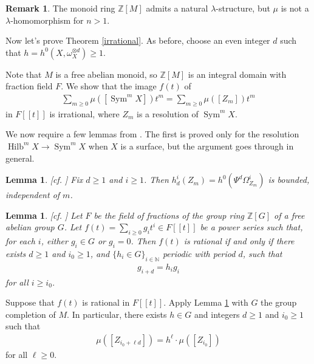 \documentclass{amsart}
\newtheorem{lem}[thm]{Lemma}
\theoremstyle{definition}
\newtheorem{rmk}[thm]{Remark}
\DeclareMathOperator{\Sym}{Sym}
\DeclareMathOperator{\Hilb}{Hilb}
\numberwithin{equation}{section}
\begin{document}
\begin{rmk}
The monoid ring $\mathbb{Z}[M]$ admits a natural $\lambda$-structure, but $\mu$ is not a $\lambda$-homomorphism for $n > 1$.
\end{rmk}


Now let's prove Theorem \ref{irrational}. As before, choose an even integer $d$ such that $h=h^0(X, \omega_X^{\otimes d}) \geq 1$.

Note that $M$ is a free abelian monoid, so $\mathbb{Z}[M]$ is an integral domain with fraction field $F$. We show that the image $f(t)$ of
\begin{align*}
    \sum_{m \geq 0} \mu([\Sym^m X]) t^m = \sum_{m \geq 0} \mu([Z_m]) t^m
\end{align*}
in $F[[t]]$ is irrational, where $Z_m$ is a resolution of $\Sym^m X$.

We now require a few lemmas from \cite{larsenluntsrationality}. The first is proved only for the resolution $\Hilb^m X \rightarrow \Sym^m X$ when $X$ is a surface, but the argument goes through in general.

\begin{lem}\label{bounded}[cf. \cite[Proposition $7.5$]{larsenluntsrationality}]
Fix $d \geq 1$ and $i \geq 1$. Then $h_d^i(Z_m) = h^0(\Psi^d \Omega_{Z_m}^i)$ is bounded, independent of $m$.
\end{lem}

\begin{lem}\label{rationality criteria}[cf. \cite[Proposition $2.6$]{larsenluntsrationality}]
Let $F$ be the field of fractions of the group ring $\mathbb{Z}[G]$ of a free abelian group $G$. Let $f(t) = \sum_{i \geq 0} g_i t^i \in F[[t]]$ be a power series such that, for each $i$, either $g_i \in G$ or $g_i=0$. Then $f(t)$ is rational if and only if there exists $d \geq 1$ and $i_0 \geq 1$, and $\{ h_i \in G \}_{i \in \mathbb{N}}$ periodic with period $d$, such that 
\begin{align*}
    g_{i+d} = h_i g_i
\end{align*}
for all $i \geq i_0$.
\end{lem}

Suppose that $f(t)$ is rational in $F[[t]]$. Apply Lemma \ref{rationality criteria} with $G$ the group completion of $M$. In particular, there exists $h \in G$ and integers $d \geq 1$ and $i_0 \geq 1$ such that
\begin{align*}
    \mu ([Z_{i_0+\ell d}]) = h^\ell \cdot \mu ([Z_{i_0} ])
\end{align*}
for all $\ell \geq 0$.
\end{document}
